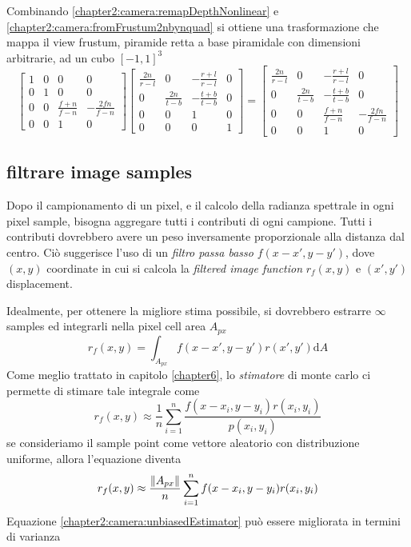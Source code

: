 Combinando \ref{chapter2:camera:remapDepthNonlinear} e \ref{chapter2:camera:fromFrustum2nbynquad} si ottiene una trasformazione che mappa il view
frustum, piramide retta a base piramidale con dimensioni arbitrarie, ad un cubo $[-1,1]^3$
\begin{equation}\label{chapter2:camera:perspectiveMatrix}
	\begin{bmatrix}
		1 & 0 & 0 & 0 \\ 0 & 1 & 0 & 0 \\ 0 & 0 & \frac{f+n}{f-n} & -\frac{2fn}{f-n} \\ 0 & 0 & 1 & 0
	\end{bmatrix}
	\begin{bmatrix}
		\frac{2n}{r-l} & 0 & -\frac{r+l}{r-l} & 0 \\ 0 & \frac{2n}{t-b} & -\frac{t+b}{t-b} & 0 \\ 0 & 0 & 1 & 0 \\ 0 & 0 & 0 & 1
	\end{bmatrix}
	=
	\begin{bmatrix}
		\frac{2n}{r-l} & 0 & -\frac{r+l}{r-l} & 0 \\ 0 & \frac{2n}{t-b} & -\frac{t+b}{t-b} & 0 \\ 0 & 0 & \frac{f+n}{f-n} & -\frac{2fn}{f-n} 
		\\ 0 & 0 & 1 & 0
	\end{bmatrix}
\end{equation}
\subsection{filtrare image samples}
Dopo il campionamento di un pixel, e il calcolo della radianza spettrale in ogni pixel sample, bisogna aggregare tutti i contributi di ogni campione.
Tutti i contributi dovrebbero avere un peso inversamente proporzionale alla distanza dal centro. Ci\`o suggerisce l'uso di un 
\textit{filtro passa basso} $f(x-x',y-y')$, dove $(x,y)$ coordinate in cui si calcola la \textit{filtered image function} 
$r_f(x,y)$ e $(x',y')$ displacement.\par
Idealmente, per ottenere la migliore stima possibile, si dovrebbero estrarre $\infty$ samples ed integrarli nella pixel cell area $A_{px}$
\begin{equation}
	r_f(x,y) = \int_{A_{px}} f(x-x', y-y')r(x',y') \mathrm{d}A
\end{equation}
Come meglio trattato in capitolo \ref{chapter6}, lo \textit{stimatore} di monte carlo ci permette di stimare tale integrale come
\begin{equation}
	r_f(x,y) \approx \frac{1}{n}\sum_{i=1}^n \frac{f(x-x_i, y-y_i)r(x_i, y_i)}{p(x_i, y_i)}
\end{equation}
se consideriamo il sample point come vettore aleatorio con distribuzione uniforme, allora l'equazione diventa
\begin{equation}\label{chapter2:camera:unbiasedEstimator}
	r_f(x,y) \approx \frac{\norm{A_{px}}}{n}\sum_{i=1}^n f(x-x_i, y-y_i)r(x_i, y_i)
\end{equation}
Equazione \ref{chapter2:camera:unbiasedEstimator} pu\`o essere migliorata in termini di varianza

